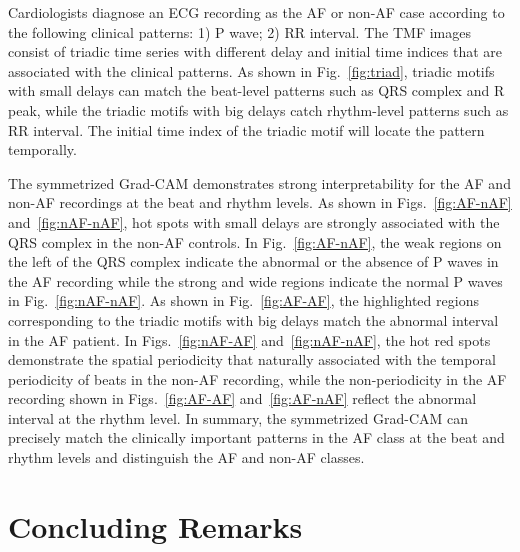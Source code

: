\documentclass[journal]{IEEEtran}
\begin{document}
Cardiologists diagnose an ECG recording as the AF or non-AF case according to the following clinical patterns: 1) P wave; 2) RR interval. 
The TMF images consist of triadic time series with different delay and initial time indices that are associated with the clinical patterns. As shown in Fig.~\ref{fig:triad}, triadic motifs with small delays can match the beat-level patterns such as QRS complex and R peak, while the triadic motifs with big delays catch rhythm-level patterns such as RR interval. The initial time index of the triadic motif will locate the pattern temporally.

The symmetrized Grad-CAM demonstrates strong interpretability for the AF and non-AF recordings at the beat and rhythm levels. 
As shown in Figs.~\ref{fig:AF-nAF} and~\ref{fig:nAF-nAF}, hot spots with small delays are strongly associated with the QRS complex in the non-AF controls. In Fig.~\ref{fig:AF-nAF}, the weak regions on the left of the QRS complex indicate the abnormal or the absence of P waves in the AF recording while the strong and wide regions indicate the normal P waves in Fig.~\ref{fig:nAF-nAF}.
As shown in Fig.~\ref{fig:AF-AF}, the highlighted regions corresponding to the triadic motifs with big delays match the abnormal interval in the AF patient. 
In Figs.~\ref{fig:nAF-AF} and~\ref{fig:nAF-nAF}, the hot red spots demonstrate the spatial periodicity that naturally associated with the temporal periodicity of beats in the non-AF recording, while the non-periodicity in the AF recording shown in Figs.~\ref{fig:AF-AF} and~\ref{fig:AF-nAF} reflect the abnormal interval at the rhythm level. 
In summary, the symmetrized Grad-CAM can precisely match the clinically important patterns in the AF class at the beat and rhythm levels and distinguish the AF and non-AF classes.


\section{Concluding Remarks}
\end{document}
